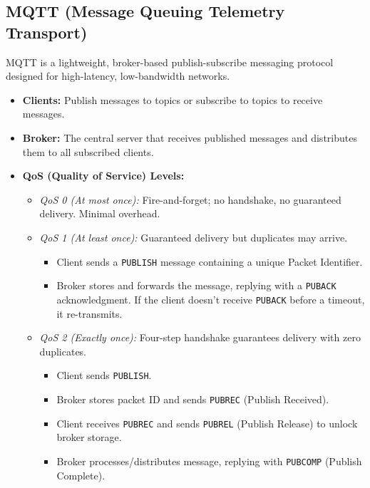 \documentclass[12pt,a4paper]{article}
\begin{document}
\subsection{MQTT (Message Queuing Telemetry Transport)}
MQTT is a lightweight, broker-based publish-subscribe messaging protocol designed for high-latency, low-bandwidth networks.
\begin{itemize}[leftmargin=*, itemsep=2.5pt]
  \item \textbf{Clients:} Publish messages to topics or subscribe to topics to receive messages.
  \item \textbf{Broker:} The central server that receives published messages and distributes them to all subscribed clients.
  \item \textbf{QoS (Quality of Service) Levels:}
        \begin{itemize}[leftmargin=*, label=$\bullet$, itemsep=3.0pt]
          \item \textit{QoS 0 (At most once):} Fire-and-forget; no handshake, no guaranteed delivery. Minimal overhead.
          \item \textit{QoS 1 (At least once):} Guaranteed delivery but duplicates may arrive.
                \begin{itemize}[leftmargin=*, label=$\circ$, itemsep=1.0pt]
                  \item Client sends a \texttt{PUBLISH} message containing a unique Packet Identifier.
                  \item Broker stores and forwards the message, replying with a \texttt{PUBACK} acknowledgment. If the client doesn't receive \texttt{PUBACK} before a timeout, it re-transmits.
                \end{itemize}
          \item \textit{QoS 2 (Exactly once):} Four-step handshake guarantees delivery with zero duplicates.
                \begin{itemize}[leftmargin=*, label=$\circ$, itemsep=1.0pt]
                  \item Client sends \texttt{PUBLISH}.
                  \item Broker stores packet ID and sends \texttt{PUBREC} (Publish Received).
                  \item Client receives \texttt{PUBREC} and sends \texttt{PUBREL} (Publish Release) to unlock broker storage.
                  \item Broker processes/distributes message, replying with \texttt{PUBCOMP} (Publish Complete).
                \end{itemize}
        \end{itemize}
\end{itemize}
\end{document}
